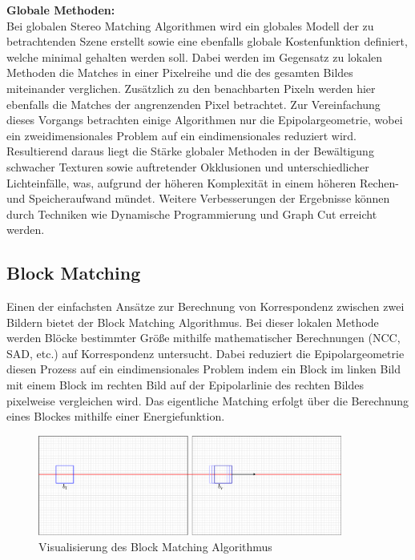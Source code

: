 \noindent
\textbf{Globale Methoden:}\\
Bei globalen Stereo Matching Algorithmen wird ein globales Modell der zu betrachtenden Szene erstellt sowie eine ebenfalls globale Kostenfunktion definiert, welche minimal gehalten werden soll. Dabei werden im Gegensatz zu lokalen Methoden die Matches in einer Pixelreihe und die des gesamten Bildes miteinander verglichen. Zusätzlich zu den benachbarten Pixeln werden hier ebenfalls die Matches der angrenzenden Pixel betrachtet. Zur Vereinfachung dieses Vorgangs betrachten einige Algorithmen nur die Epipolargeometrie, wobei ein zweidimensionales Problem auf ein eindimensionales reduziert wird. Resultierend daraus liegt die Stärke globaler Methoden in der Bewältigung schwacher Texturen sowie auftretender Okklusionen und unterschiedlicher Lichteinfälle, was, aufgrund der höheren Komplexität in einem höheren Rechen- und Speicheraufwand mündet. Weitere Verbesserungen der Ergebnisse können durch Techniken wie Dynamische Programmierung und Graph Cut erreicht werden.

\subsection{Block Matching}
\label{subsec:stereo_matching_bm}
Einen der einfachsten Ansätze zur Berechnung von Korrespondenz zwischen zwei Bildern bietet der Block Matching Algorithmus. Bei dieser lokalen Methode werden Blöcke bestimmter Größe mithilfe mathematischer Berechnungen (NCC, SAD, etc.) auf Korrespondenz untersucht. Dabei reduziert die Epipolargeometrie diesen Prozess auf ein eindimensionales Problem indem ein Block im linken Bild mit einem Block im rechten Bild auf der Epipolarlinie des rechten Bildes pixelweise vergleichen wird. Das eigentliche Matching erfolgt über die Berechnung eines Blockes mithilfe einer Energiefunktion.

\begin{figure}[h]
	\begin{center}
		\includegraphics[width=10cm]{img/block_matching.pdf}
	\end{center}
	\caption{Visualisierung des Block Matching Algorithmus}
	\label{fig:block_matching}
\end{figure}

